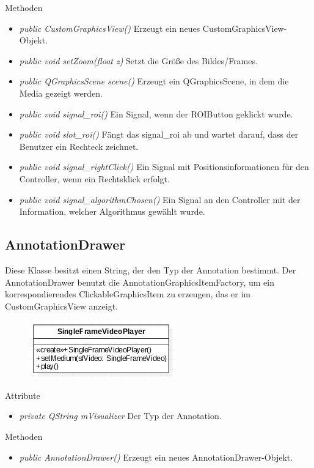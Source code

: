 Methoden
\begin{itemize}
	\item\textit{public CustomGraphicsView()} 
	Erzeugt ein neues CustomGraphicsView-Objekt.
	\item\textit{public void setZoom(float z)} 
	Setzt die Größe des Bildes/Frames.
	\item\textit{public QGraphicsScene scene()} 
	Erzeugt ein QGraphicsScene, in dem die Media gezeigt werden.
	\item\textit{public void signal\_roi()} 
	Ein Signal, wenn der ROIButton geklickt wurde.
	\item\textit{public void slot\_roi()} 
	Fängt das signal\_roi ab und wartet darauf, dass der Benutzer ein Rechteck zeichnet.
	\item\textit{public void signal\_rightClick()} 
	Ein Signal mit Positionsinformationen für den Controller, wenn ein Rechtsklick erfolgt. 
	\item\textit{public void signal\_algorithmChosen()} 
	Ein Signal an den Controller mit der Information, welcher Algorithmus gewählt wurde.
\end{itemize}

\subsection*{AnnotationDrawer}
Diese Klasse besitzt einen String, der den Typ der Annotation bestimmt. Der AnnotationDrawer benutzt die AnnotationGraphicsItemFactory, um ein korrespondierendes ClickableGraphicsItem zu erzeugen, das er im CustomGraphicsView anzeigt.

\begin{figure}[H]
	\centering
	\includegraphics[scale=0.5]{img/Klassendiagramm/Klassen/View/AnnotationDrawer}
	\label{fig:annotationDrawer}
\end{figure}

Attribute
\begin{itemize}
	\item\textit{private QString mVisualizer} 
	Der Typ der Annotation.   
\end{itemize}

Methoden
\begin{itemize}
	\item\textit{public AnnotationDrawer()} 
	Erzeugt ein neues AnnotationDrawer-Objekt.
\end{itemize}
  
